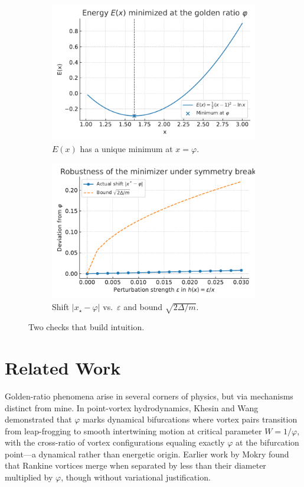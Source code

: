 \documentclass[11pt]{article}
\theoremstyle{remark}
\theoremstyle{definition}
\newcommand{\ph}{\varphi}
\newcommand{\eps}{\varepsilon}
\begin{document}
\begin{figure}[t]
  \centering
  \begin{subfigure}{0.48\linewidth}
    \centering
    \includegraphics[width=\linewidth]{E_of_x_min_at_phi.pdf}
    \caption{$E(x)$ has a unique minimum at $x=\ph$.}
  \end{subfigure}\hfill
  \begin{subfigure}{0.48\linewidth}
    \centering
    \includegraphics[width=\linewidth]{robustness_shift_vs_epsilon.pdf}
    \caption{Shift $|x_\star-\ph|$ vs.\ $\eps$ and bound $\sqrt{2\Delta/m}$.}
  \end{subfigure}
  \caption{Two checks that build intuition.}
\end{figure}

\FloatBarrier

\section{Related Work}
Golden-ratio phenomena arise in several corners of physics, but via mechanisms distinct from mine. In point-vortex hydrodynamics, Khesin and Wang \cite{khesin2021} demonstrated that $\ph$ marks dynamical bifurcations where vortex pairs transition from leap-frogging to smooth intertwining motion at critical parameter $W=1/\ph$, with the cross-ratio of vortex configurations equaling exactly $\ph$ at the bifurcation point---a dynamical rather than energetic origin. Earlier work by Mokry \cite{mokry2008} found that Rankine vortices merge when separated by less than their diameter multiplied by $\ph$, though without variational justification.
\end{document}

